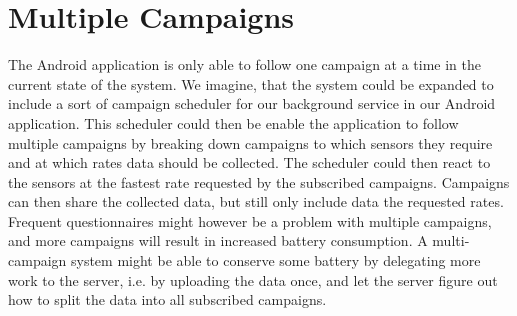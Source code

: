 
\section{Multiple Campaigns}
\label{sec:multiple_campaigns}

The Android application is only able to follow one campaign at a time in the current state of the system. We imagine, that the system could be expanded to include a sort of campaign scheduler for our background service in our Android application. This scheduler could then be enable the application to follow multiple campaigns by breaking down campaigns to which sensors they require and at which rates data should be collected. The scheduler could then react to the sensors at the fastest rate requested by the subscribed campaigns. Campaigns can then share the collected data, but still only include data the requested rates. Frequent questionnaires might however be a problem with multiple campaigns, and more campaigns will result in increased battery consumption. A multi-campaign system might be able to conserve some battery by delegating more work to the server, i.e. by uploading the data once, and let the server figure out how to split the data into all subscribed campaigns. 